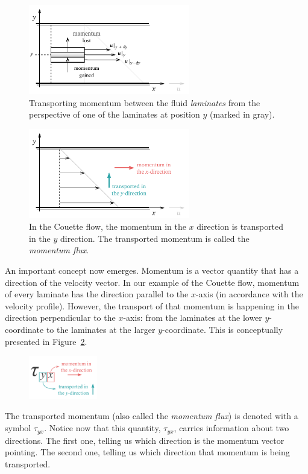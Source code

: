 \documentclass[10pt,twocolumn]{article}
\begin{document}
\begin{figure}[H]
\centering\includegraphics[width=7cm]{momentum-transport-in-laminates.pdf}
\caption{Transporting momentum between the fluid \textit{laminates} from the perspective of one of the laminates at position $y$ (marked in gray).}
\label{fig:momentum-transport-in-laminates}
\end{figure}
\begin{figure}[H]
\centering\includegraphics[width=7cm]{couette-flow-momentum-transport.pdf}
\caption{In the Couette flow, the momentum in the $x$ direction is transported in the $y$ direction. The transported momentum is called the \textit{momentum flux}.}
\label{fig:couette-flow-momentum-transport}
\end{figure}
An important concept now emerges. Momentum is a vector quantity that has a direction of the velocity vector. In our example of the Couette flow, momentum of every laminate has the direction parallel to the $x$-axis (in accordance with the velocity profile). However, the transport of that momentum is happening in the direction perpendicular to the $x$-axis: from the laminates at the lower $y$-coordinate to the laminates at the larger $y$-coordinate. This is conceptually presented in Figure~\ref{fig:couette-flow-momentum-transport}. 

\begin{figure}
\centering\includegraphics[width=3cm]{tau_y_x.pdf}
\label{fig:tau_y_x}
\end{figure}
The transported momentum (also called the \textit{momentum flux}) is denoted with a symbol $\tau_{yx}$. Notice now that this quantity, $\tau_{yx}$, carries information about two directions. The first one, telling us which direction is the momentum vector pointing. The second one, telling us which direction that momentum is being transported.
\end{document}
